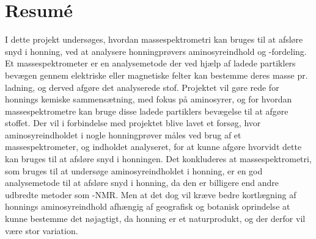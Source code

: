 \vspace*{2.5cm}
\section*{Resumé}
I dette projekt undersøges, hvordan massespektrometri kan bruges til at afsløre snyd i honning, ved at analysere honningprøvers aminosyreindhold og -fordeling.
Et massespektrometer er en analysemetode der ved hjælp af ladede partiklers bevægen gennem elektriske eller magnetiske felter kan bestemme deres masse pr. ladning, og derved afgøre det analyserede stof.
Projektet vil gøre rede for honnings kemiske sammensætning, med fokus på aminosyrer, og for hvordan massespektrometre kan bruge disse ladede partiklers bevægelse til at afgøre stoffet.
Der vil i forbindelse med projektet blive lavet et forsøg, hvor aminosyreindholdet i nogle honningprøver måles ved brug af et massespektrometer,
og indholdet analyseret, for at kunne afgøre hvorvidt dette kan bruges til at afsløre snyd i honningen.
\newline Det konkluderes at massespektrometri, som bruges til at undersøge aminosyreindholdet i honning, er en god analysemetode til at afsløre snyd i honning,
da den er billigere end andre udbredte metoder som -NMR.
Men at det dog vil kræve bedre kortlægning af honnings aminosyreindhold afhængig af geografisk og botanisk oprindelse at kunne bestemme det nøjagtigt,
da honning er et naturprodukt, og der derfor vil være stor variation.

